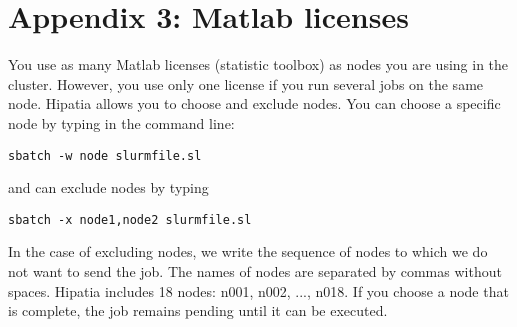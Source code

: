 \documentclass[a4paper]{article}
\begin{document}
	\section{Appendix 3: Matlab licenses}
	You use as many Matlab licenses (statistic toolbox) as nodes you are using in the cluster. However, you use only one license if you run several jobs on the same node. Hipatia allows you to choose and exclude nodes. You can choose a specific node by typing in the command line:
\begin{center}
\begin{lstlisting}[caption=Choose a specific node, label=lst:choosenode]
			sbatch -w node slurmfile.sl
\end{lstlisting}
\end{center}
and can exclude nodes by typing 
\begin{center}
\begin{lstlisting}[caption=Exclude nodes, label=lst:excludenode]
			sbatch -x node1,node2 slurmfile.sl
\end{lstlisting}
\end{center}
In the case of excluding nodes, we write the sequence of nodes to which we do not want to send the job. The names of nodes are separated by commas without spaces. 
Hipatia includes 18 nodes: n001, n002, ..., n018. If you choose a node that is complete, the job remains pending until it can be executed.
\end{document}
